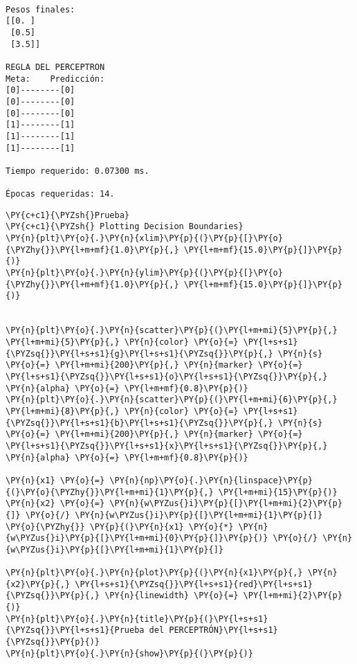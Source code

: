     \begin{Verbatim}[commandchars=\\\{\}]

Pesos finales:
[[0. ]
 [0.5]
 [3.5]]

REGLA DEL PERCEPTRON
Meta:    Predicción:
[0]--------[0]
[0]--------[0]
[0]--------[0]
[1]--------[1]
[1]--------[1]
[1]--------[1]

Tiempo requerido: 0.07300 ms.

Épocas requeridas: 14.
    \end{Verbatim}

    \begin{tcolorbox}[breakable, size=fbox, boxrule=1pt, pad at break*=1mm,colback=cellbackground, colframe=cellborder]
\begin{Verbatim}[commandchars=\\\{\}]
\PY{c+c1}{\PYZsh{}Prueba}
\PY{c+c1}{\PYZsh{} Plotting Decision Boundaries}
\PY{n}{plt}\PY{o}{.}\PY{n}{xlim}\PY{p}{(}\PY{p}{[}\PY{o}{\PYZhy{}}\PY{l+m+mf}{1.0}\PY{p}{,} \PY{l+m+mf}{15.0}\PY{p}{]}\PY{p}{)}
\PY{n}{plt}\PY{o}{.}\PY{n}{ylim}\PY{p}{(}\PY{p}{[}\PY{o}{\PYZhy{}}\PY{l+m+mf}{1.0}\PY{p}{,} \PY{l+m+mf}{15.0}\PY{p}{]}\PY{p}{)}


\PY{n}{plt}\PY{o}{.}\PY{n}{scatter}\PY{p}{(}\PY{l+m+mi}{5}\PY{p}{,} \PY{l+m+mi}{5}\PY{p}{,} \PY{n}{color} \PY{o}{=} \PY{l+s+s1}{\PYZsq{}}\PY{l+s+s1}{g}\PY{l+s+s1}{\PYZsq{}}\PY{p}{,} \PY{n}{s} \PY{o}{=} \PY{l+m+mi}{200}\PY{p}{,} \PY{n}{marker} \PY{o}{=} \PY{l+s+s1}{\PYZsq{}}\PY{l+s+s1}{o}\PY{l+s+s1}{\PYZsq{}}\PY{p}{,} \PY{n}{alpha} \PY{o}{=} \PY{l+m+mf}{0.8}\PY{p}{)}
\PY{n}{plt}\PY{o}{.}\PY{n}{scatter}\PY{p}{(}\PY{l+m+mi}{6}\PY{p}{,} \PY{l+m+mi}{8}\PY{p}{,} \PY{n}{color} \PY{o}{=} \PY{l+s+s1}{\PYZsq{}}\PY{l+s+s1}{b}\PY{l+s+s1}{\PYZsq{}}\PY{p}{,} \PY{n}{s} \PY{o}{=} \PY{l+m+mi}{200}\PY{p}{,} \PY{n}{marker} \PY{o}{=} \PY{l+s+s1}{\PYZsq{}}\PY{l+s+s1}{x}\PY{l+s+s1}{\PYZsq{}}\PY{p}{,} \PY{n}{alpha} \PY{o}{=} \PY{l+m+mf}{0.8}\PY{p}{)}

\PY{n}{x1} \PY{o}{=} \PY{n}{np}\PY{o}{.}\PY{n}{linspace}\PY{p}{(}\PY{o}{\PYZhy{}}\PY{l+m+mi}{1}\PY{p}{,} \PY{l+m+mi}{15}\PY{p}{)}
\PY{n}{x2} \PY{o}{=} \PY{n}{w\PYZus{}i}\PY{p}{[}\PY{l+m+mi}{2}\PY{p}{]} \PY{o}{/} \PY{n}{w\PYZus{}i}\PY{p}{[}\PY{l+m+mi}{1}\PY{p}{]} \PY{o}{\PYZhy{}} \PY{p}{(}\PY{n}{x1} \PY{o}{*} \PY{n}{w\PYZus{}i}\PY{p}{[}\PY{l+m+mi}{0}\PY{p}{]}\PY{p}{)} \PY{o}{/} \PY{n}{w\PYZus{}i}\PY{p}{[}\PY{l+m+mi}{1}\PY{p}{]}

\PY{n}{plt}\PY{o}{.}\PY{n}{plot}\PY{p}{(}\PY{n}{x1}\PY{p}{,} \PY{n}{x2}\PY{p}{,} \PY{l+s+s1}{\PYZsq{}}\PY{l+s+s1}{red}\PY{l+s+s1}{\PYZsq{}}\PY{p}{,} \PY{n}{linewidth} \PY{o}{=} \PY{l+m+mi}{2}\PY{p}{)}
\PY{n}{plt}\PY{o}{.}\PY{n}{title}\PY{p}{(}\PY{l+s+s1}{\PYZsq{}}\PY{l+s+s1}{Prueba del PERCEPTRÓN}\PY{l+s+s1}{\PYZsq{}}\PY{p}{)}
\PY{n}{plt}\PY{o}{.}\PY{n}{show}\PY{p}{(}\PY{p}{)}
\end{Verbatim}
\end{tcolorbox}

    \begin{center}
    \end{center}
    { \hspace*{\fill} \\}
    

    
    